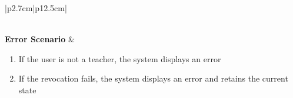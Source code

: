 \begin{table}[H]
\begin{tabular}{|p{2.7cm}|p{12.5cm}|}
\begin{minipage}[t]{\linewidth}
                                  \end{minipage}                                       \\
        \hline
        \textbf{Error Scenario} & \begin{minipage}[t]{\linewidth}
                                      \begin{enumerate}[topsep=0pt,itemsep=1pt,parsep=0pt,partopsep=0pt]
                                          \item If the user is not a teacher, the system displays an error
                                          \item If the revocation fails, the system displays an error and retains the current
                                                state
                                      \end{enumerate}
                                  \end{minipage}                        \\
        \hline
    \end{tabular}
    \label{tab:admin-revoke-teacher}
\end{table}
